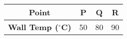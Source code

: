\begin{tabular}{|c|c|c|c|}
    \hline
    \textbf{Point} & P & Q & R \\
    \hline
    \textbf{Wall Temp ($^{\circ}$C)} & 50 & 80 & 90 \\
    \hline
 \end{tabular}